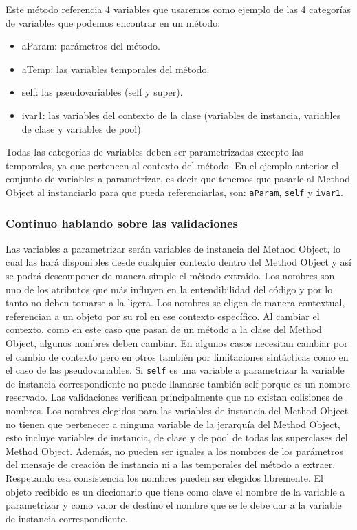 Este método referencia 4 variables que usaremos como ejemplo de las 4 categorías de variables que podemos
encontrar en un método:

\begin{itemize}
    \item aParam: parámetros del método.
    \item aTemp: las variables temporales del método.
    \item self: las pseudovariables (self y super).
    \item ivar1: las variables del contexto de la clase (variables de instancia, variables de clase y variables de pool)
\end{itemize}

Todas las categorías de variables deben ser parametrizadas excepto las temporales, ya que pertencen
al contexto del método. En el ejemplo anterior el conjunto de variables a parametrizar, es decir que
tenemos que pasarle al Method Object al instanciarlo para que pueda referenciarlas, son: \lstinline{aParam},
\lstinline{self} y \lstinline{ivar1}.

\subsubsection{Continuo hablando sobre las validaciones}

Las variables a parametrizar serán variables de instancia del Method Object, lo cual las hará
disponibles desde cualquier contexto dentro del Method Object y así se podrá descomponer de manera
simple el método extraido. Los nombres son uno de los atributos que más influyen en la
entendibilidad del código y por lo tanto no deben tomarse a la ligera. Los nombres se eligen de
manera contextual, referencian a un objeto por su rol en ese contexto específico. Al cambiar el
contexto, como en este caso que pasan de un método a la clase del Method Object, algunos nombres
deben cambiar. En algunos casos necesitan cambiar por el cambio de contexto pero en otros también
por limitaciones sintácticas como en el caso de las pseudovariables. Si \lstinline{self} es una
variable a parametrizar la variable de instancia correspondiente no puede llamarse también self
porque es un nombre reservado. Las validaciones verifican principalmente que no existan colisiones
de nombres. Los nombres elegidos para las variables de instancia del Method Object no tienen que
pertenecer a ninguna variable de la jerarquía del Method Object, esto incluye variables de
instancia, de clase y de pool de todas las superclases del Method Object. Además, no pueden ser
iguales a los nombres de los parámetros del mensaje de creación de instancia ni a las temporales del
método a extraer. Respetando esa consistencia los nombres pueden ser elegidos libremente. El objeto recibido
es un diccionario que tiene como clave el nombre de la variable a parametrizar y como valor de destino
el nombre que se le debe dar a la variable de instancia correspondiente.



